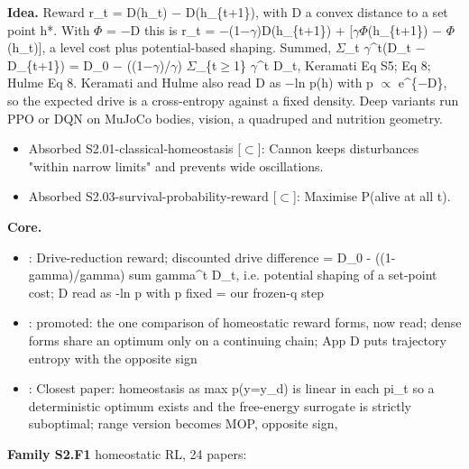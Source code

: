 \documentclass[10pt]{article}
\newcommand{\memb}[1]{\par\smallskip\textbf{#1}\quad}
\begin{document}
\textbf{Idea.} Reward r\_t = D(h\_t) \ensuremath{-} D(h\_\{t+1\}), with D a convex distance to a set point h*. With \ensuremath{\Phi} = \ensuremath{-}D this is r\_t = \ensuremath{-}(1\ensuremath{-}\ensuremath{\gamma})D(h\_\{t+1\}) + [\ensuremath{\gamma}\ensuremath{\Phi}(h\_\{t+1\}) \ensuremath{-} \ensuremath{\Phi}(h\_t)], a level cost plus potential-based shaping. Summed, \ensuremath{\Sigma}\_t \ensuremath{\gamma}\^{}t(D\_t \ensuremath{-} D\_\{t+1\}) = D\_0 \ensuremath{-} ((1\ensuremath{-}\ensuremath{\gamma})/\ensuremath{\gamma}) \ensuremath{\Sigma}\_\{t\ensuremath{\geq}1\} \ensuremath{\gamma}\^{}t D\_t, Keramati Eq S5; \citet{Laurencon-continuous24} Eq 8; Hulme Eq 8. Keramati and Hulme also read D as \ensuremath{-}ln p(h) with p \ensuremath{\propto} e\^{}\{\ensuremath{-}D\}, so the expected drive is a cross-entropy against a fixed density. Deep variants run PPO or DQN on MuJoCo bodies, vision, a quadruped and nutrition geometry.
\begin{itemize}[nosep,leftmargin=1.2em]
\item Absorbed S2.01-classical-homeostasis [\ensuremath{\subset}]: Cannon keeps disturbances "within narrow limits" and prevents wide oscillations.
\item Absorbed S2.03-survival-probability-reward [\ensuremath{\subset}]: Maximise P(alive at all t).
\end{itemize}


\memb{Core.}
\begin{itemize}[nosep,leftmargin=1.2em]
\item \citet{Keramati-homeostatic14}: Drive-reduction reward; discounted drive difference = D\_0 - ((1-gamma)/gamma) sum gamma\^{}t D\_t, i.e. potential shaping of a set-point cost; D read as -ln p with p fixed = our frozen-q step
\item \citet{Yoshida-emergence24}: promoted: the one comparison of homeostatic reward forms, now read; dense forms share an optimum only on a continuing chain; App D puts trajectory entropy with the opposite sign
\item \citet{MorenoBote-homeostasis26}: Closest paper: homeostasis as max p(y=y\_d) is linear in each pi\_t so a deterministic optimum exists and the free-energy surrogate is strictly suboptimal; range version becomes MOP, opposite sign,
\end{itemize}
\memb{Family S2.F1} homeostatic RL, 24 papers: {\footnotesize \citetext{\citealp{Keramati-homeostatic14}; \citealp{Yoshida-emergence24}; \citealp{Bersini-reinforcement94}\dag; \citealp{Keramati-reinforcement11}; \citealp{Morville-homeostatic18}; \citealp{Laurencon-continuous21}; \citealp{Yoshida-homeostatic23}; \citealp{Laurencon-continuous24}; \citealp{Pihlakas-homeostasis24}; \citealp{Yoshida-modeling24}; \citealp{Yoshida-synthesising24}; \citealp{Lee-evaaa25}\dag; \citealp{Yoshida-linking25}; \citealp{Yoshida-meta25}; \citealp{Yoshida-unexpected25}\dag; \citealp{Schneider-artificial15}\dag; \citealp{Keramati-misdeed17}; \citealp{Dassanayake-deep19}; \citealp{Uchida-computational22}; \citealp{Duriez-homeostatic23}; \citealp{Hall-computational24}; \citealp{Clingo-modeling26}; \citealp{Gomes-homeostaticenv26}; \citealp{Nouri-emergent26}\dag}}
\end{document}
